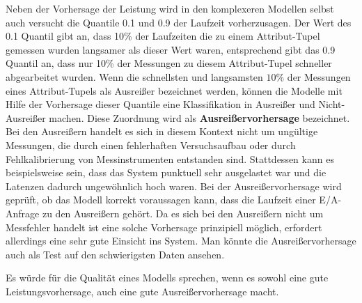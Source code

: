 \documentclass[
	12pt,
	a4paper,
	BCOR10mm,
	DIV14,
	listof=totoc,
	bibliography=totoc,
	headsepline
]{scrreprt}
\begin{document}
Neben der Vorhersage der Leistung wird in den komplexeren Modellen selbst auch versucht die Quantile 0.1 und 0.9 der Laufzeit vorherzusagen. Der Wert des 0.1 Quantil gibt an, dass 10\% der Laufzeiten die zu einem Attribut-Tupel gemessen wurden langsamer als dieser Wert waren, entsprechend gibt das 0.9 Quantil an, dass nur 10\% der Messungen zu diesem Attribut-Tupel schneller abgearbeitet wurden.
Wenn die schnellsten und langsamsten $10\%$ der Messungen eines Attribut-Tupels als Ausreißer bezeichnet werden, können die Modelle mit Hilfe der Vorhersage dieser Quantile eine Klassifikation in Ausreißer und Nicht-Ausreißer machen. Diese Zuordnung wird als \textbf{Ausreißervorhersage} bezeichnet.
Bei den Ausreißern handelt es sich in diesem Kontext nicht um ungültige Messungen, die durch einen fehlerhaften Versuchsaufbau oder durch Fehlkalibrierung von Messinstrumenten entstanden sind. Stattdessen kann es beispielsweise sein, dass das System punktuell sehr ausgelastet war und die Latenzen dadurch ungewöhnlich hoch waren. 
Bei der Ausreißervorhersage wird geprüft, ob das Modell korrekt voraussagen kann, dass die Laufzeit einer E/A-Anfrage zu den Ausreißern gehört. Da es sich bei den Ausreißern nicht um Messfehler handelt ist eine solche Vorhersage prinzipiell möglich, erfordert allerdings eine sehr gute Einsicht ins System.
Man könnte die Ausreißervorhersage auch als Test auf den schwierigsten Daten ansehen. 

Es würde für die Qualität eines Modells sprechen, wenn es sowohl eine gute Leistungsvorhersage, auch eine gute Ausreißervorhersage macht.
\end{document}
